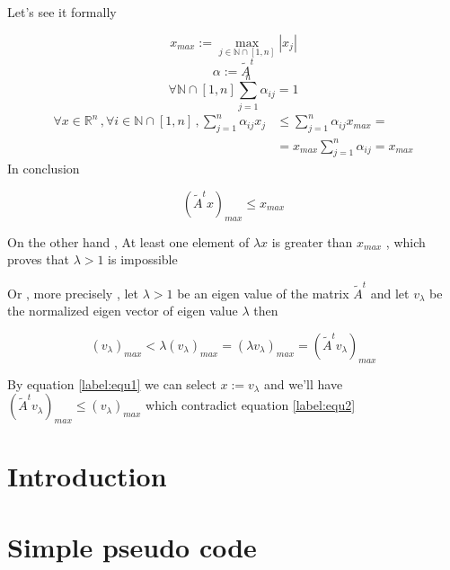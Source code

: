\documentclass[9pt,twocolumn]{article}
\begin{document}
Let's see it formally

\[
x_{max} := \max_{j\in\mathbb{N}\cap [1,n]}{|x_j|}
\]
\[
\alpha := \tilde{A}^t
\]
\[
\forall \mathbb{N}\cap [1,n] \sum_{j=1}^{n} \alpha_{ij} = 1
\]
\begin{align*}
\forall x\in \mathbb{R}^{n} \,, \forall i\in\mathbb{N}\cap [1,n]  \,, \sum_{j=1}^n\alpha _{ij} x_{j}  &\leq\sum_{j=1}^n \alpha_{ij}x_{max}= \\
                                                                    &=x_{max} \sum_{j=1}^{n} \alpha_{ij} = x_{max}
\end{align*}
In conclusion

\begin{equation}
\label{label:equ1}
(\tilde{A}^t x)_{max} \leq x_{max}
\end{equation}

On the other hand , At least one element of \(\lambda x\) is greater than \(x_{max}\) , which proves that
\(\lambda > 1\) is impossible

Or , more precisely , let \(\lambda > 1\) be an eigen value of the matrix
\(\tilde{A}^t\) and let \(v_{\lambda}\) be the normalized eigen vector of
eigen value \(\lambda\) then

\begin{equation}
\label{label:equ2}
(v_{\lambda})_{max} <
\lambda (v_{\lambda})_{max} =
( \lambda v_{\lambda} )_{max} =
( \tilde{A}^t v_{\lambda} )_{max}
\end{equation}

By equation \ref{label:equ1} we can select \(x:=v_{\lambda}\) and we'll have
\((\tilde{A}^t v_{\lambda})_{max} \leq (v_{\lambda})_{max}\) which contradict equation \ref{label:equ2}





\section*{Introduction}
\label{sec:org4444284}

\section*{Simple pseudo code}
\label{sec:orgc342242}
\end{document}
